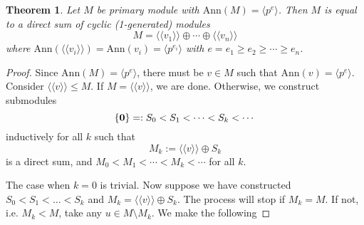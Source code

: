 \documentclass[12pt]{amsbook}
\newtheorem{theorem}{Theorem}[section]
\begin{document}
\begin{theorem}\label{thm-decom}
    Let $M$ be primary module with $\mathrm{Ann}(M)=\langle p^e\rangle$. Then $M$ is equal to a direct sum of cyclic (1-generated) modules
    $$M=\langle\langle v_1\rangle\rangle\oplus\cdots\oplus\langle\langle v_n\rangle\rangle$$
    where $\mathrm{Ann}(\langle\langle v_i\rangle\rangle)=\mathrm{Ann}(v_i)= \langle p^{e_i} \rangle$ with $e=e_1\geq e_2\geq\cdots\geq e_n$.
\end{theorem}

\begin{proof}
    Since $\mathrm{Ann}(M)=\langle p^e\rangle$, there must be $v\in M$ such that $\mathrm{Ann}(v)=\langle p^e\rangle$.\\
    Consider $\langle\langle v\rangle\rangle\leq M$.  If $M=\langle\langle v\rangle\rangle$, we are done. Otherwise, we construct submodules $$\{{\bf 0}\}=: S_0< S_1< \cdots < S_k < \cdots$$ 
    inductively for all $k$ such that
    $$M_k :=\langle\langle v\rangle\rangle\oplus S_k$$
    is a direct sum, and $M_0<M_1< \cdots < M_k < \cdots$ for all $k$.
    \medskip
    
    The case when $k = 0$ is trivial. Now suppose we have constructed $S_0 < S_1 < \dots < S_k$ and
    $M_k = \langle \langle v \rangle \rangle \oplus S_k$. The process will stop if $M_k = M$. If not, i.e. $M_k<M$, take any $u\in M\setminus M_k$. We make the following 

    \bigskip
    \noindent {}
\bigskip


\end{proof}
\end{document}
